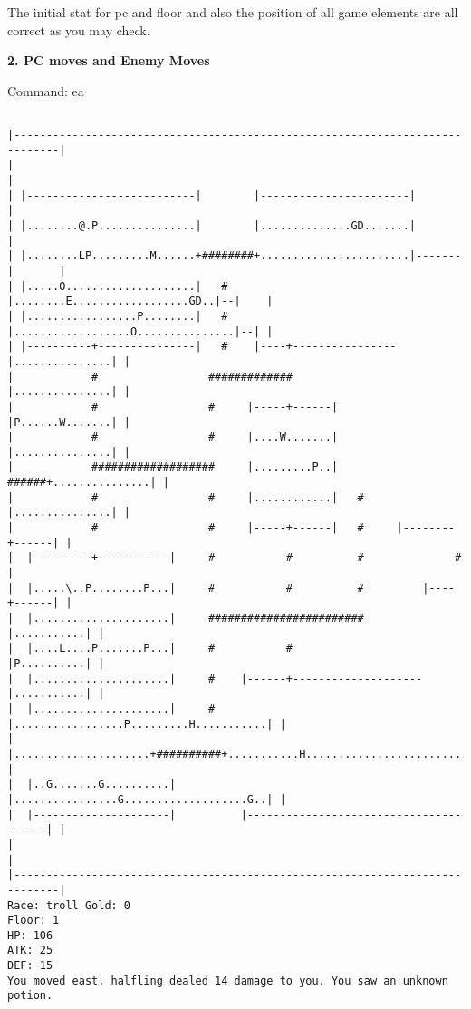 \documentclass[11pt]{article}
\theoremstyle{plain}
\begin{document}
The initial stat for pc and floor and also the position of all game elements
are all correct as you may check.

\newpage
\textbf{2. PC moves and Enemy Moves}

Command: ea
\begin{Verbatim}[fontsize=\scriptsize]

|-----------------------------------------------------------------------------|
|                                                                             |
| |--------------------------|        |-----------------------|               |
| |........@.P...............|        |..............GD.......|               |
| |........LP.........M......+########+.......................|-------|       |
| |.....O....................|   #    |........E..................GD..|--|    |
| |.................P........|   #    |..................O...............|--| |
| |----------+---------------|   #    |----+----------------|...............| |
|            #                 #############                |...............| |
|            #                 #     |-----+------|         |P......W.......| |
|            #                 #     |....W.......|         |...............| |
|            ###################     |.........P..|   ######+...............| |
|            #                 #     |............|   #     |...............| |
|            #                 #     |-----+------|   #     |--------+------| |
|  |---------+-----------|     #           #          #              #        |
|  |.....\..P........P...|     #           #          #         |----+------| |
|  |.....................|     ########################         |...........| |
|  |....L....P.......P...|     #           #                    |P..........| |
|  |.....................|     #    |------+--------------------|...........| |
|  |.....................|     #    |.................P.........H...........| |
|  |.....................+##########+...........H...........................| |
|  |..G.......G..........|          |................G...................G..| |
|  |---------------------|          |---------------------------------------| |
|                                                                             |
|-----------------------------------------------------------------------------|
Race: troll Gold: 0                                                    Floor: 1
HP: 106
ATK: 25
DEF: 15
You moved east. halfling dealed 14 damage to you. You saw an unknown potion. 
\end{Verbatim}
\end{document}
